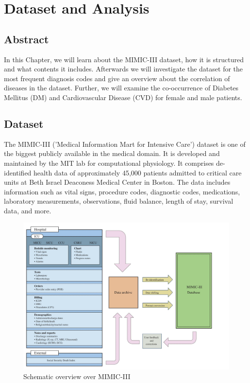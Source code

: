 \documentclass[11pt, a4paper, oneside]{book}
\begin{document}
\chapter{Dataset and Analysis}
\section{Abstract}
In this Chapter, we will learn about the MIMIC-III dataset, how it is structured and what contents it includes. Afterwards we will investigate the dataset for the most frequent diagnosis codes and give an overview about the correlation of diseases in the dataset. Further, we will examine the co-occurrence  of Diabetes Mellitus (DM) and Cardiovascular Disease (CVD) for female and male patients.

\section{Dataset}
The MIMIC-III ('Medical Information Mart for Intensive Care') dataset is one of the biggest publicly available in the medical domain. It is developed and maintained by the MIT lab for computational physiology. It comprises de-identified health data of approximately 45,000 patients admitted to critical care units at Beth Israel Deaconess Medical Center in Boston. The data includes information such as vital signs, procedure codes, diagnostic codes, medications, laboratory measurements, observations, fluid balance, length of stay, survival data, and more. 
\begin{figure}
  \begin{center}
  \includegraphics[width=1\textwidth]{img/mimicIII-schema.png}
  \caption{Schematic overview over MIMIC-III}
  \label{fig:mimic-III-schema}
  \end{center}
\end{figure}
\end{document}
